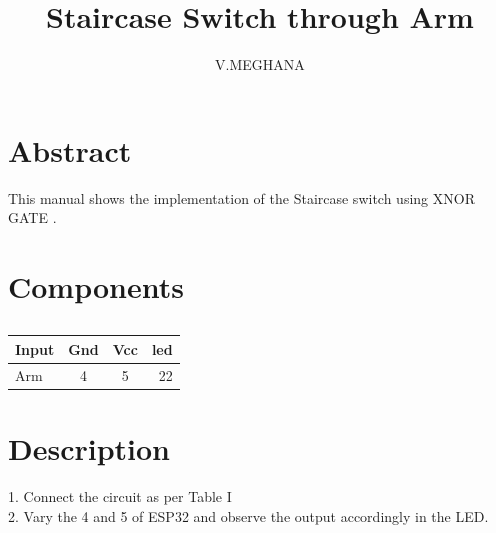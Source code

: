 \documentclass[journal,12pt,twocolumn]{IEEEtran}
\begin{document}
%

\theoremstyle{definition}
\newtheorem{theorem}{Theorem}[section]
\newtheorem{problem}{Problem}
\newtheorem{proposition}{Proposition}[section]
\newtheorem{lemma}{Lemma}[section]
\newtheorem{corollary}[theorem]{Corollary}
\newtheorem{example}{Example}[section]
\newtheorem{definition}{Definition}[section]
\newcommand{\BEQA}{\begin{eqnarray}}
\newcommand{\EEQA}{\end{eqnarray}}
\newcommand{\define}{\stackrel{\triangle}{=}}
\vspace{3cm}
\title{ 
Staircase Switch through Arm
}

\author{V.MEGHANA}


\maketitle
\tableofcontents
\bigskip
%
\section{Abstract}

This manual shows the implementation of the Staircase switch using XNOR GATE .
\section{\textbf{Components}}


\begin{table}[ht]
\centering
\begin{tabular}{|l|c|c|r|}
\hline
Input & Gnd & Vcc & led\\
\hline
Arm & 4 & 5 & 22\\
\hline
\end{tabular}
\caption{}
\label{tab:first table}
\end{table}
\section{Description}

1. Connect the circuit as per Table I\\
2. Vary the 4 and 5 of ESP32 and observe the output 
accordingly in the LED.
\end{document}
